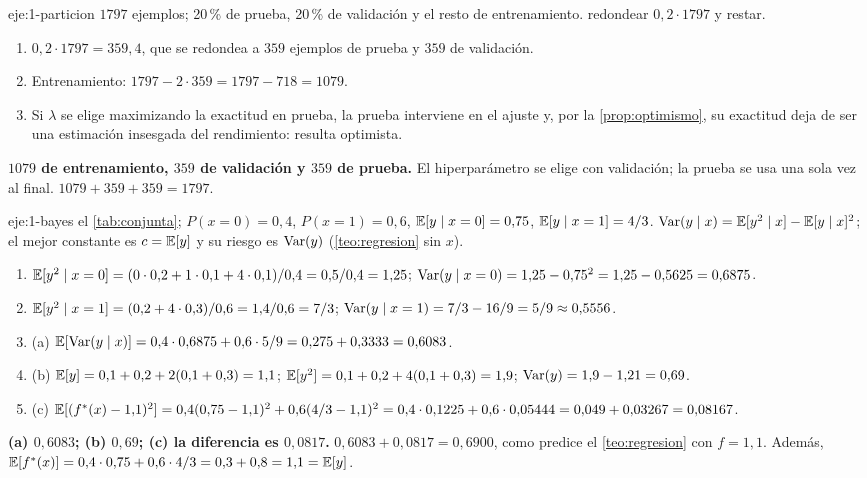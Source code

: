 \begin{solucion}{eje:1-particion}
\datos $1797$ ejemplos; 20\,\% de prueba, 20\,\% de validación y el resto de entrenamiento.
\planteamiento redondear $0{,}2\cdot 1797$ y restar.
\pasos
\begin{enumerate}[label=\arabic*.]
  \item $0{,}2\cdot 1797=359{,}4$, que se redondea a $359$ ejemplos de prueba y $359$ de validación.
  \item Entrenamiento: $1797-2\cdot 359=1797-718=1079$.
  \item Si $\lambda$ se elige maximizando la exactitud en prueba, la prueba interviene en el ajuste y, por la \cref{prop:optimismo}, su exactitud deja de ser una estimación insesgada del rendimiento: resulta optimista.
\end{enumerate}
\resultado \textbf{$1079$ de entrenamiento, $359$ de validación y $359$ de prueba.} El hiperparámetro se elige con validación; la prueba se usa una sola vez al final.
\comprobacion $1079+359+359=1797$.
\end{solucion}

\begin{solucion}{eje:1-bayes}
\datos el \cref{tab:conjunta}; $P(x=0)=0{,}4$, $P(x=1)=0{,}6$, $\mathbb{E}[y\mid x=0]=0{,}75$, $\mathbb{E}[y\mid x=1]=4/3$.
\planteamiento $\operatorname{Var}(y\mid x)=\mathbb{E}[y^{2}\mid x]-\mathbb{E}[y\mid x]^{2}$; el mejor constante es $c=\mathbb{E}[y]$ y su riesgo es $\operatorname{Var}(y)$ (\cref{teo:regresion} sin $x$).
\pasos
\begin{enumerate}[label=\arabic*.]
  \item $\mathbb{E}[y^{2}\mid x=0]=(0\cdot 0{,}2+1\cdot 0{,}1+4\cdot 0{,}1)/0{,}4=0{,}5/0{,}4=1{,}25$; $\operatorname{Var}(y\mid x=0)=1{,}25-0{,}75^{2}=1{,}25-0{,}5625=0{,}6875$.
  \item $\mathbb{E}[y^{2}\mid x=1]=(0{,}2+4\cdot 0{,}3)/0{,}6=1{,}4/0{,}6=7/3$; $\operatorname{Var}(y\mid x=1)=7/3-16/9=5/9\approx 0{,}5556$.
  \item (a) $\mathbb{E}[\operatorname{Var}(y\mid x)]=0{,}4\cdot 0{,}6875+0{,}6\cdot 5/9=0{,}275+0{,}3333=0{,}6083$.
  \item (b) $\mathbb{E}[y]=0{,}1+0{,}2+2(0{,}1+0{,}3)=1{,}1$; $\mathbb{E}[y^{2}]=0{,}1+0{,}2+4(0{,}1+0{,}3)=1{,}9$; $\operatorname{Var}(y)=1{,}9-1{,}21=0{,}69$.
  \item (c) $\mathbb{E}[(f^{*}(x)-1{,}1)^{2}]=0{,}4(0{,}75-1{,}1)^{2}+0{,}6(4/3-1{,}1)^{2}=0{,}4\cdot 0{,}1225+0{,}6\cdot 0{,}05444=0{,}049+0{,}03267=0{,}08167$.
\end{enumerate}
\resultado \textbf{(a) $0{,}6083$; (b) $0{,}69$; (c) la diferencia es $0{,}0817$.}
\comprobacion $0{,}6083+0{,}0817=0{,}6900$, como predice el \cref{teo:regresion} con $f=1{,}1$. Además, $\mathbb{E}[f^{*}(x)]=0{,}4\cdot 0{,}75+0{,}6\cdot 4/3=0{,}3+0{,}8=1{,}1=\mathbb{E}[y]$.
\end{solucion}

